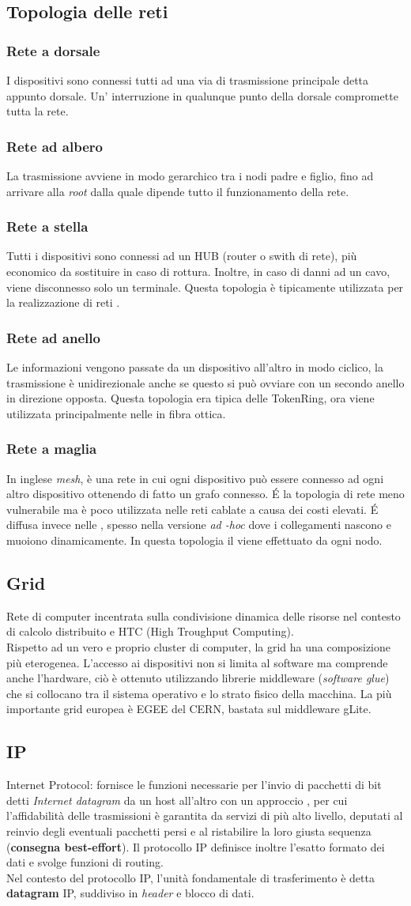 \documentclass[a4paper,11pt]{article}
\def\sub#1{\subsection{#1}\label{#1}}
\def\subsub#1{\subsubsection{#1}\label{#1}}
\def\vedi#1{\nameref{#1}}
\begin{document}
\newpage
\sub{Topologia delle reti}
\subsub{Rete a dorsale}
I dispositivi sono connessi tutti ad una via di trasmissione principale detta appunto dorsale. Un' interruzione in qualunque punto della dorsale compromette tutta la rete.
\subsub{Rete ad albero} La trasmissione avviene in modo gerarchico tra i nodi padre e figlio, fino ad arrivare alla \textit{root} dalla quale dipende tutto il funzionamento della rete.
\subsub{Rete a stella} Tutti i dispositivi sono connessi ad un HUB (router o swith di rete), più economico da sostituire in caso di rottura. Inoltre, in caso di danni ad un cavo, viene disconnesso solo un terminale. Questa topologia è tipicamente utilizzata per la realizzazione di reti \vedi{LAN}. 
\subsub{Rete ad anello} Le informazioni vengono passate da un dispositivo all'altro in modo ciclico, la trasmissione è unidirezionale anche se questo si può ovviare con un secondo anello in direzione opposta. Questa topologia era tipica delle \vedi{LAN} TokenRing, ora viene utilizzata principalmente nelle \vedi{MAN} in fibra ottica.
\subsub{Rete a maglia} In inglese \textit{mesh}, è una rete in cui ogni dispositivo può essere connesso ad ogni altro dispositivo ottenendo di fatto un grafo connesso. \'E la topologia di rete meno vulnerabile ma è poco utilizzata nelle reti cablate a causa dei costi elevati. \'E diffusa invece nelle \vedi{WLAN}, spesso nella versione \textit{ad -hoc} dove i collegamenti nascono e muoiono dinamicamente. In questa topologia il \vedi{Routing} viene effettuato da ogni nodo.

\sub{Grid}
Rete di computer incentrata sulla condivisione dinamica delle risorse nel contesto di calcolo distribuito e HTC (High Troughput Computing).\\ Rispetto ad un vero e proprio cluster di computer, la grid ha una composizione più eterogenea. L'accesso ai dispositivi non si limita al software ma comprende anche l'hardware, ciò è ottenuto utilizzando librerie middleware (\textit{software glue}) che si collocano tra il sistema operativo e lo strato fisico della macchina. La più importante grid europea è EGEE del CERN, bastata sul middleware gLite.%
 
\newpage
\sub{IP}
Internet Protocol: fornisce le funzioni necessarie per l'invio di pacchetti di bit detti \textit{Internet datagram} da un host all'altro con un approccio \vedi{Connectionless}, per cui l'affidabilità delle trasmissioni è garantita da servizi di più alto livello, deputati al reinvio degli eventuali pacchetti persi e al ristabilire la loro giusta sequenza (\textbf{consegna best-effort}). 
Il protocollo IP definisce inoltre l'esatto formato dei dati e svolge funzioni di routing.
\\Nel contesto del protocollo IP, l'unità fondamentale di trasferimento è detta \textbf{datagram} IP, suddiviso in \textit{header} e blocco di dati.
\end{document}
